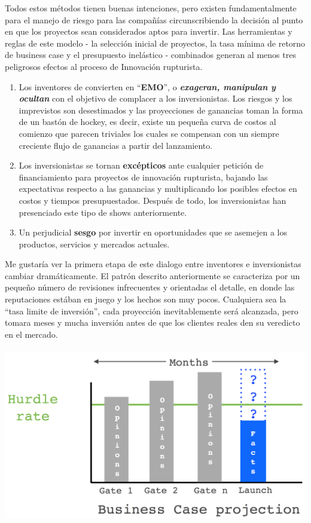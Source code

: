 \documentclass{article}
\begin{document}
Todos estos m\'etodos tienen buenas intenciones, pero existen fundamentalmente para el manejo de riesgo para las compa\~n\'ias circunscribiendo la decisi\'on al punto en que los proyectos sean considerados aptos para invertir. Las herramientas y reglas de este modelo - la selecci\'on inicial de proyectos, la tasa m\'inima de retorno de business case y el presupuesto inel\'astico - combinados generan al menos tres peligrosos efectos al proceso de Innovaci\'on rupturista.

\begin{enumerate}
  \item Los inventores de convierten en ``\textbf{EMO}'', o \textbf{\textit{exageran, manipulan y ocultan}} con el objetivo de complacer a los inversionistas. Los riesgos y los imprevistos son desestimados y las proyecciones de ganancias toman la forma de un bast\'on de hockey, es decir, existe un peque\~na curva de costos al comienzo que parecen triviales los cuales se compensan con un siempre creciente flujo de ganancias a partir del lanzamiento.
  
  \item Los inversionistas se tornan \textbf{exc\'epticos} ante cualquier petici\'on de financiamiento para proyectos de innovaci\'on rupturista, bajando las expectativas respecto a las ganancias y multiplicando los posibles efectos en costos y tiempos presupuestados. Despu\'es de todo, los inversionistas han presenciado este tipo de shows anteriormente.
  
  \item Un perjudicial \textbf{sesgo} por invertir en oportunidades que se asemejen a los productos, servicios y mercados actuales.
\end{enumerate}

Me gustar\'ia ver la primera etapa de este dialogo entre inventores e inversionistas cambiar dram\'aticamente. El patr\'on descrito anteriormente se caracteriza por un peque\~no n\'umero de revisiones infrecuentes y orientadas el detalle, en donde las reputaciones est\'aban en juego y los hechos son muy pocos. Cualquiera sea la ``tasa limite de inversi\'on'', cada proyecci\'on inevitablemente ser\'a alcanzada, pero tomara meses y mucha inversi\'on antes de que los clientes reales den su veredicto en el mercado.
\\ \\
    \includegraphics[width=1.0\textwidth]{bussines_case_projection}
\\ \\
\end{document}
